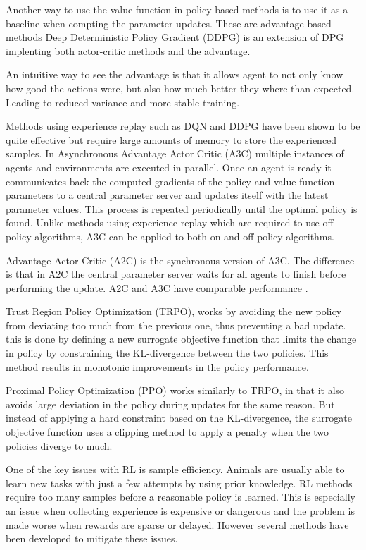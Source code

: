Another way to use the value function in policy-based methods is to use it as a baseline when compting the parameter updates. These are advantage based methods Deep Deterministic Policy Gradient (DDPG) is an extension of DPG \cite{lillicrap2015continuous} implenting both actor-critic methods and the advantage.

An intuitive way to see the advantage is that it allows agent to not only know how good the actions were, but also how much better they where than expected. Leading to reduced variance and more stable training.

Methods using experience replay such as DQN and DDPG have been shown to be quite effective but require large amounts of memory to store the experienced samples. In Asynchronous Advantage Actor Critic (A3C) \cite{mnih2016asynchronous} multiple instances of agents and environments are executed in parallel. Once an agent is ready it communicates back the computed gradients of the policy and value function parameters to a central parameter server and updates itself with the latest parameter values. This process is repeated periodically until the optimal policy is found. Unlike methods using experience replay which are required to use off-policy algorithms, A3C can be applied to both on and off policy algorithms.

Advantage Actor Critic (A2C) is the synchronous version of A3C. The difference is that in A2C the central parameter server waits for all agents to finish before performing the update. A2C and A3C have comparable performance \cite{mnih2016asynchronous}.


Trust Region Policy Optimization (TRPO), works by avoiding the new policy from deviating too much from the previous one, thus preventing a bad update. this is done by defining a new surrogate objective function that limits the change in policy by constraining the KL-divergence between the two policies. This method results in monotonic improvements in the policy performance.

Proximal Policy Optimization (PPO) works similarly to TRPO, in that it also avoids large deviation in the policy during updates for the same reason. But instead of applying a hard constraint based on the KL-divergence, the surrogate objective function uses a clipping method to apply a penalty when the two policies diverge to much.

One of the key issues with RL is sample efficiency. Animals are usually able to learn new tasks with just a few attempts by using prior knowledge. RL methods require too many samples before a reasonable policy is learned. This is especially an issue when collecting experience is expensive or dangerous and the problem is made worse when rewards are sparse or delayed. However several methods have been developed to mitigate these issues. 

